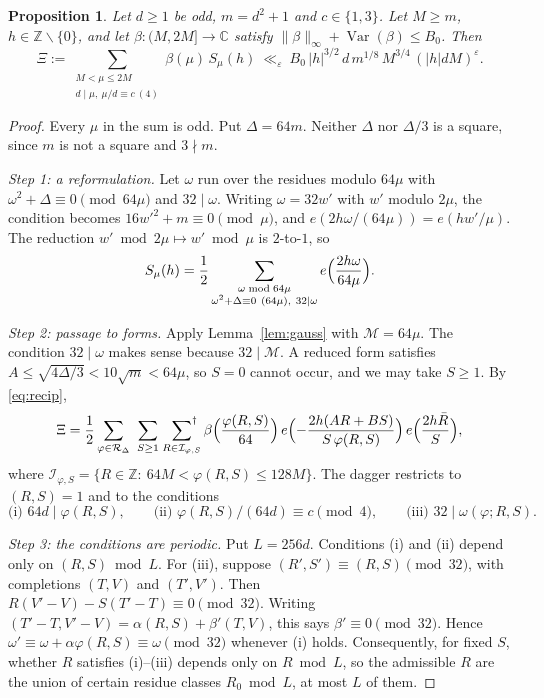 \documentclass[11pt]{amsart}
\newtheorem{proposition}[theorem]{Proposition}
\theoremstyle{remark}
\theoremstyle{definition}
\numberwithin{equation}{section}
\newcommand{\Z}{\mathbb{Z}}
\newcommand{\eps}{\varepsilon}
\newcommand{\Var}{\operatorname{Var}}
\begin{document}
\begin{proposition}\label{prop:weyl}
Let $d\ge1$ be odd, $m=d^2+1$ and $c\in\{1,3\}$. Let $M\ge m$, $h\in\Z\smallsetminus\{0\}$, and let $\beta:(M,2M]\to\mathbb C$ satisfy $\|\beta\|_\infty+\Var(\beta)\le B_0$. Then
\[
\Xi:=\sum_{\substack{M<\mu\le 2M\\ d\mid\mu,\ \mu/d\equiv c\ (4)}}\beta(\mu)\,S_\mu(h)\ \ll_\eps\ B_0\,|h|^{3/2}\,d\,m^{1/8}\,M^{3/4}\,(|h|dM)^{\eps}.
\]
\end{proposition}

\begin{proof}
Every $\mu$ in the sum is odd. Put $\Delta=64m$. Neither $\Delta$ nor $\Delta/3$ is a square, since $m$ is not a square and $3\nmid m$.

\emph{Step 1: a reformulation.} Let $\omega$ run over the residues modulo $64\mu$ with $\omega^2+\Delta\equiv0\pmod{64\mu}$ and $32\mid\omega$. Writing $\omega=32w'$ with $w'$ modulo $2\mu$, the condition becomes $16w'^2+m\equiv0\pmod\mu$, and $e(2h\omega/(64\mu))=e(hw'/\mu)$. The reduction $w'\bmod 2\mu\mapsto w'\bmod\mu$ is $2$-to-$1$, so
\[
S_\mu(h)=\frac12\sum_{\substack{\omega\bmod 64\mu\\ \omega^2+\Delta\equiv0\ (64\mu),\ 32\mid\omega}}e\Bigl(\frac{2h\omega}{64\mu}\Bigr).
\]

\emph{Step 2: passage to forms.} Apply Lemma~\ref{lem:gauss} with $\mathcal M=64\mu$. The condition $32\mid\omega$ makes sense because $32\mid\mathcal M$. A reduced form satisfies $A\le\sqrt{4\Delta/3}<10\sqrt m<64\mu$, so $S=0$ cannot occur, and we may take $S\ge1$. By \eqref{eq:recip},
\[
\Xi=\frac12\sum_{\varphi\in\mathcal R_\Delta}\ \sum_{S\ge1}\ \sideset{}{^\dagger}\sum_{R\in\mathcal I_{\varphi,S}}\beta\Bigl(\frac{\varphi(R,S)}{64}\Bigr)\,e\Bigl(-\frac{2h(AR+BS)}{S\,\varphi(R,S)}\Bigr)\,e\Bigl(\frac{2h\bar R}{S}\Bigr),
\]
where $\mathcal I_{\varphi,S}=\{R\in\Z:\ 64M<\varphi(R,S)\le128M\}$. The dagger restricts to $(R,S)=1$ and to the conditions
\begin{equation}\label{eq:conds}
\text{(i) } 64d\mid\varphi(R,S),\qquad\text{(ii) }\varphi(R,S)/(64d)\equiv c\pmod 4,\qquad \text{(iii) } 32\mid\omega(\varphi;R,S).
\end{equation}

\emph{Step 3: the conditions are periodic.} Put $L=256d$. Conditions (i) and (ii) depend only on $(R,S)\bmod L$. For (iii), suppose $(R',S')\equiv(R,S)\pmod{32}$, with completions $(T,V)$ and $(T',V')$. Then $R(V'-V)-S(T'-T)\equiv0\pmod{32}$. Writing $(T'-T,V'-V)=\alpha(R,S)+\beta'(T,V)$, this says $\beta'\equiv0\pmod{32}$. Hence $\omega'\equiv\omega+\alpha\varphi(R,S)\equiv\omega\pmod{32}$ whenever (i) holds. Consequently, for fixed $S$, whether $R$ satisfies (i)--(iii) depends only on $R\bmod L$, so the admissible $R$ are the union of certain residue classes $R_0\bmod L$, at most $L$ of them.


\end{proof}
\end{document}
